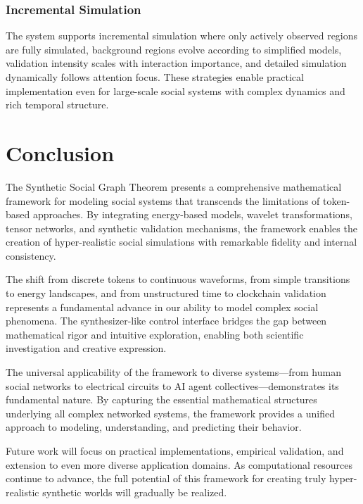 \documentclass[11pt,a4paper]{article}
\begin{document}
\subsubsection{Incremental Simulation}

The system supports incremental simulation where only actively observed regions are fully simulated, background regions evolve according to simplified models, validation intensity scales with interaction importance, and detailed simulation dynamically follows attention focus. These strategies enable practical implementation even for large-scale social systems with complex dynamics and rich temporal structure.

\section{Conclusion}

The Synthetic Social Graph Theorem presents a comprehensive mathematical framework for modeling social systems that transcends the limitations of token-based approaches. By integrating energy-based models, wavelet transformations, tensor networks, and synthetic validation mechanisms, the framework enables the creation of hyper-realistic social simulations with remarkable fidelity and internal consistency.

The shift from discrete tokens to continuous waveforms, from simple transitions to energy landscapes, and from unstructured time to clockchain validation represents a fundamental advance in our ability to model complex social phenomena. The synthesizer-like control interface bridges the gap between mathematical rigor and intuitive exploration, enabling both scientific investigation and creative expression.

The universal applicability of the framework to diverse systems—from human social networks to electrical circuits to AI agent collectives—demonstrates its fundamental nature. By capturing the essential mathematical structures underlying all complex networked systems, the framework provides a unified approach to modeling, understanding, and predicting their behavior.

Future work will focus on practical implementations, empirical validation, and extension to even more diverse application domains. As computational resources continue to advance, the full potential of this framework for creating truly hyper-realistic synthetic worlds will gradually be realized.
\end{document}
